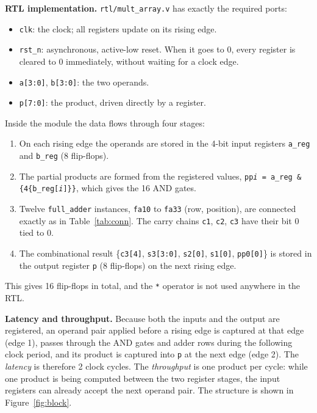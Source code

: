 \documentclass[10pt,a4paper,twocolumn]{article}
\begin{document}
\textbf{RTL implementation.} \texttt{rtl/mult\_array.v} has exactly the required ports:
\begin{itemize}[nosep]
  \item \texttt{clk}: the clock; all registers update on its rising edge.
  \item \texttt{rst\_n}: asynchronous, active-low reset. When it goes to 0, every register is cleared to 0
        immediately, without waiting for a clock edge.
  \item \texttt{a[3:0]}, \texttt{b[3:0]}: the two operands.
  \item \texttt{p[7:0]}: the product, driven directly by a register.
\end{itemize}
Inside the module the data flows through four stages:
\begin{enumerate}[nosep]
  \item On each rising edge the operands are stored in the 4-bit input registers \texttt{a\_reg} and
        \texttt{b\_reg} (8 flip-flops).
  \item The partial products are formed from the registered values, \texttt{pp\textit{i} = a\_reg \&
        \{4\{b\_reg[\textit{i}]\}\}}, which gives the 16 AND gates.
  \item Twelve \texttt{full\_adder} instances, \texttt{fa10} to \texttt{fa33} (row, position), are connected
        exactly as in Table~\ref{tab:conn}. The carry chains \texttt{c1}, \texttt{c2}, \texttt{c3} have their
        bit 0 tied to 0.
  \item The combinational result \{\texttt{c3[4]}, \texttt{s3[3:0]}, \texttt{s2[0]}, \texttt{s1[0]},
        \texttt{pp0[0]}\} is stored in the output register \texttt{p} (8 flip-flops) on the next rising edge.
\end{enumerate}
This gives 16 flip-flops in total, and the \texttt{*} operator is not used anywhere in the RTL.

\textbf{Latency and throughput.} Because both the inputs and the output are registered, an operand pair
applied before a rising edge is captured at that edge (edge 1), passes through the AND gates and adder rows
during the following clock period, and its product is captured into \texttt{p} at the next edge (edge 2).
The \emph{latency} is therefore 2 clock cycles. The \emph{throughput} is one product per cycle: while one
product is being computed between the two register stages, the input registers can already accept the
next operand pair. The structure is shown in Figure~\ref{fig:block}.
\end{document}
